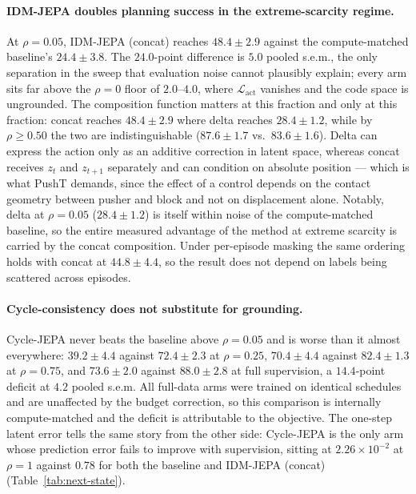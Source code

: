\documentclass{article}
\begin{document}
\paragraph{IDM-JEPA doubles planning success in the extreme-scarcity regime.}
At $\rho = 0.05$, IDM-JEPA (concat) reaches $48.4 \pm 2.9$ against the
compute-matched baseline's $24.4 \pm 3.8$. The $24.0$-point difference is $5.0$
pooled s.e.m., the only separation in the sweep that evaluation noise cannot
plausibly explain; every arm sits far above the $\rho = 0$ floor of
$2.0$--$4.0$, where $\mathcal{L}_{\mathrm{act}}$ vanishes and the code space is
ungrounded. The composition function matters at this fraction and only at this
fraction: concat reaches $48.4 \pm 2.9$ where delta reaches $28.4 \pm 1.2$,
while by $\rho \ge 0.50$ the two are indistinguishable ($87.6 \pm 1.7$
vs.\ $83.6 \pm 1.6$). Delta can express the action only as an additive
correction in latent space, whereas concat receives $z_t$ and $z_{t+1}$
separately and can condition on absolute position --- which is what PushT
demands, since the effect of a control depends on the contact geometry between
pusher and block and not on displacement alone. Notably, delta at $\rho = 0.05$
($28.4 \pm 1.2$) is itself within noise of the compute-matched baseline, so the
entire measured advantage of the method at extreme scarcity is carried by the
concat composition. Under per-episode masking the same ordering holds with
concat at $44.8 \pm 4.4$, so the result does not depend on labels being
scattered across episodes.


\paragraph{Cycle-consistency does not substitute for grounding.}
Cycle-JEPA never beats the baseline above $\rho = 0.05$ and is worse than it
almost everywhere: $39.2 \pm 4.4$ against $72.4 \pm 2.3$ at $\rho = 0.25$,
$70.4 \pm 4.4$ against $82.4 \pm 1.3$ at $\rho = 0.75$, and $73.6 \pm 2.0$
against $88.0 \pm 2.8$ at full supervision, a $14.4$-point deficit at $4.2$
pooled s.e.m. All full-data arms were trained on identical schedules and are
unaffected by the budget correction, so this comparison is internally
compute-matched and the deficit is attributable to the objective. The one-step
latent error tells the same story from the other side: Cycle-JEPA is the only
arm whose prediction error fails to improve with supervision, sitting at
$2.26 \times 10^{-2}$ at $\rho = 1$ against $0.78$ for both the baseline and
IDM-JEPA (concat) (Table~\ref{tab:next-state}).
\end{document}
